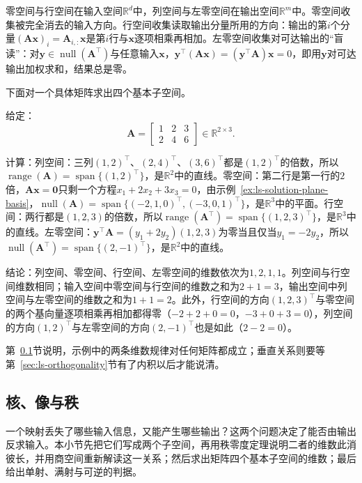 零空间与行空间在输入空间$\mathbb R^d$中，列空间与左零空间在输出空间$\mathbb R^m$中。零空间收集被完全消去的输入方向。行空间收集读取输出分量所用的方向：输出的第$i$个分量$(\bm A\bm x)_i=\bm A_{i,:}\bm x$是第$i$行与$\bm x$逐项相乘再相加。左零空间收集对可达输出的“盲读”：对$\bm y\in\operatorname{null}(\bm A^\top)$与任意输入$\bm x$，$\bm y^\top(\bm A\bm x)=(\bm y^\top\bm A)\bm x=0$，即用$\bm y$对可达输出加权求和，结果总是零。

下面对一个具体矩阵求出四个基本子空间。
\begin{example}
\label{ex:ls-rank-one-four-subspaces}
给定：
\[
 \bm A=\begin{bmatrix}1&2&3\\2&4&6\end{bmatrix}\in\mathbb R^{2\times3}.
\]

计算：列空间：三列$(1,2)^\top$、$(2,4)^\top$、$(3,6)^\top$都是$(1,2)^\top$的倍数，所以$\operatorname{range}(\bm A)=\operatorname{span}\{(1,2)^\top\}$，是$\mathbb R^2$中的直线。零空间：第二行是第一行的$2$倍，$\bm A\bm x=\bm0$只剩一个方程$x_1+2x_2+3x_3=0$，由示例~\ref{ex:ls-solution-plane-basis}，$\operatorname{null}(\bm A)=\operatorname{span}\{(-2,1,0)^\top,(-3,0,1)^\top\}$，是$\mathbb R^3$中的平面。行空间：两行都是$(1,2,3)$的倍数，所以$\operatorname{range}(\bm A^\top)=\operatorname{span}\{(1,2,3)^\top\}$，是$\mathbb R^3$中的直线。左零空间：$\bm y^\top\bm A=(y_1+2y_2)(1,2,3)$为零当且仅当$y_1=-2y_2$，所以$\operatorname{null}(\bm A^\top)=\operatorname{span}\{(2,-1)^\top\}$，是$\mathbb R^2$中的直线。

结论：列空间、零空间、行空间、左零空间的维数依次为$1,2,1,1$。列空间与行空间维数相同；输入空间中零空间与行空间的维数之和为$2+1=3$，输出空间中列空间与左零空间的维数之和为$1+1=2$。此外，行空间的方向$(1,2,3)^\top$与零空间的两个基向量逐项相乘再相加都得零（$-2+2+0=0$，$-3+0+3=0$），列空间的方向$(1,2)^\top$与左零空间的方向$(2,-1)^\top$也是如此（$2-2=0$）。
\end{example}
第~\ref{sec:ls-kernel-image}节说明，示例中的两条维数规律对任何矩阵都成立；垂直关系则要等第~\ref{sec:ls-orthogonality}节有了内积以后才能说清。

\subsection{核、像与秩}
\label{sec:ls-kernel-image}

一个映射丢失了哪些输入信息，又能产生哪些输出？这两个问题决定了能否由输出反求输入。本小节先把它们写成两个子空间，再用秩零度定理说明二者的维数此消彼长，并用商空间重新解读这一关系；然后求出矩阵四个基本子空间的维数；最后给出单射、满射与可逆的判据。

